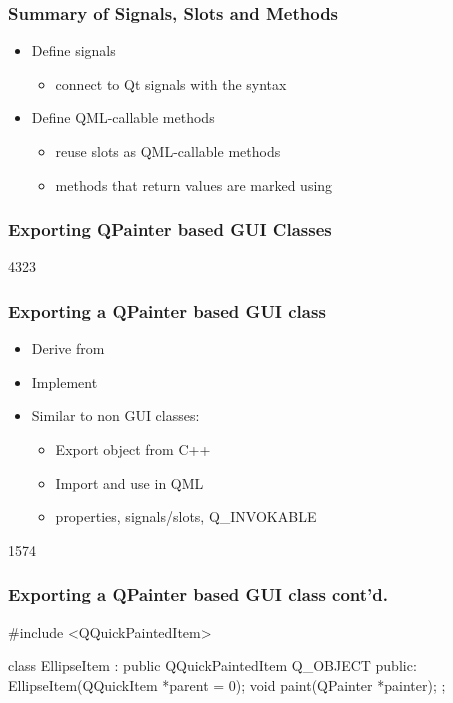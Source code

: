 
\begin{slide}\frametitle{Summary of Signals, Slots and Methods}

\begin{itemize}
\item Define signals
  \begin{itemize}
  \item connect to Qt signals with the  syntax
  \end{itemize}
\item Define QML-callable methods
  \begin{itemize}
  \item reuse slots as QML-callable methods
  \item methods that return values are marked using 
  \end{itemize}
\end{itemize}

\end{slide}


\subsubsection{Exporting QPainter based GUI Classes}

\begin{slide}{4323}\frametitle{Exporting a QPainter based GUI class}
  \begin{itemize}
  \item Derive from 
  \item Implement 
  \item Similar to non GUI classes:
    \begin{itemize}
    \item Export object from C++
    \item Import and use in QML
    \item properties, signals/slots, Q\_INVOKABLE
    \end{itemize}
  \end{itemize}
\end{slide}

\begin{slide}[fragile]{1574}\frametitle{Exporting a QPainter based GUI class cont'd.}

\begin{cpp}
#include <QQuickPaintedItem>

class EllipseItem : public QQuickPaintedItem
{
    Q_OBJECT
public:
    EllipseItem(QQuickItem *parent = 0);
    void paint(QPainter *painter);
};
\end{cpp}
\end{slide}

